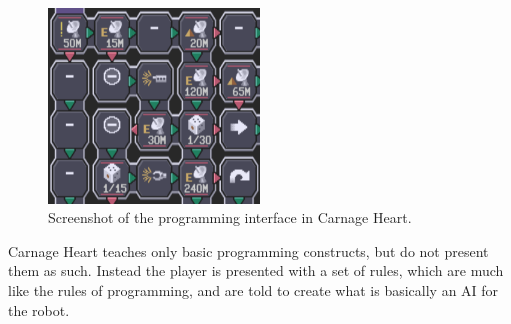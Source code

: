 \begin{figure}[hptb]
  \centering
    \includegraphics[width=0.5\textwidth]{img/CarnageHeartSoftware.png}
  \caption{Screenshot of the programming interface in Carnage Heart.\cite{carnageheartsoftware}}
  \label{fig:carnageheartsoftware}
\end{figure}

Carnage Heart teaches only basic programming constructs, but do not present them as such. Instead the player is presented with a set of rules, which are much like the rules of programming, and are told to create what is basically an AI for the robot.